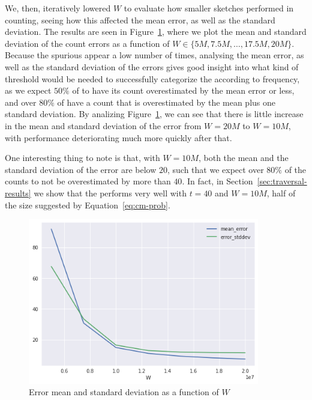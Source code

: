 We, then, iteratively lowered $W$ to evaluate how smaller sketches performed in \kmer counting, seeing how this affected the mean error, as well as the standard deviation. The results are seen in Figure~\ref{fig:ecoli-art-error}, where we plot the mean and standard deviation of the count errors as a function of $W \in \{5M, 7.5M, \ldots, 17.5M, 20M\}$. Because the spurious  appear a low number of times, analysing the mean error, as well as the standard deviation of the errors gives good insight into what kind of threshold would be needed to successfully categorize the  according to frequency, as we expect $50\%$ of  to have its count overestimated by the mean error or less, and over $80\%$ of   have a count that is overestimated by the mean plus one standard deviation. By analizing Figure~\ref{fig:ecoli-art-error}, we can see that there is little increase in the mean and standard deviation of the error from $W = 20M$ to $W = 10M$, with performance deteriorating much more quickly after that.

One interesting thing to note is that, with $W = 10M$, both the mean and the standard deviation of the error are below $20$, such that we expect over $80\%$ of the \kmer counts to not be overestimated by more than $40$. In fact, in Section~\ref{sec:traversal-results} we show that the \dBCM performs very well with $t = 40$ and $W = 10M$, half of the size suggested by Equation~\ref{eq:cm-prob}.

\begin{figure}[htbp]
    \centering
    \includegraphics[width=0.9\textwidth]{figures/e_coli-error_mean_stddev-K31-D8-T40}
    \caption{Error mean and standard deviation as a function of $W$}\label{fig:ecoli-art-error}
\end{figure}

